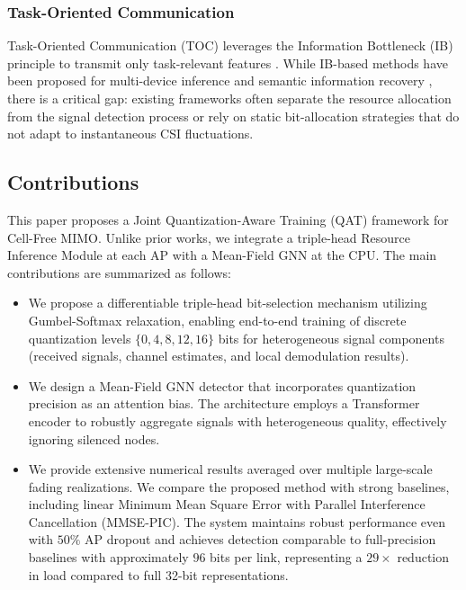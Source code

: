\subsubsection{Task-Oriented Communication}
Task-Oriented Communication (TOC) leverages the Information Bottleneck (IB) principle to transmit only task-relevant features \cite{Shao2021TaskOrientedCF, Li2024TaskOriented}. While IB-based methods have been proposed for multi-device inference and semantic information recovery \cite{Beck2023SemanticIR}, there is a critical gap: existing frameworks often separate the resource allocation from the signal detection process or rely on static bit-allocation strategies that do not adapt to instantaneous CSI fluctuations.

\subsection{Contributions}
This paper proposes a Joint Quantization-Aware Training (QAT) framework for Cell-Free MIMO. Unlike prior works, we integrate a triple-head Resource Inference Module at each AP with a Mean-Field GNN at the CPU. The main contributions are summarized as follows:
\begin{itemize}
    \item We propose a differentiable triple-head bit-selection mechanism utilizing Gumbel-Softmax relaxation, enabling end-to-end training of discrete quantization levels $\{0, 4, 8, 12, 16\}$ bits for heterogeneous signal components (received signals, channel estimates, and local demodulation results).
    \item We design a Mean-Field GNN detector that incorporates quantization precision as an attention bias. The architecture employs a Transformer encoder to robustly aggregate signals with heterogeneous quality, effectively ignoring silenced nodes.
    \item We provide extensive numerical results averaged over multiple large-scale fading realizations. We compare the proposed method with strong baselines, including linear Minimum Mean Square Error with Parallel Interference Cancellation (MMSE-PIC). The system maintains robust performance even with $50\%$ AP dropout and achieves detection comparable to full-precision baselines with approximately $96$ bits per link, representing a $29\times$ reduction in load compared to full 32-bit representations.
\end{itemize}